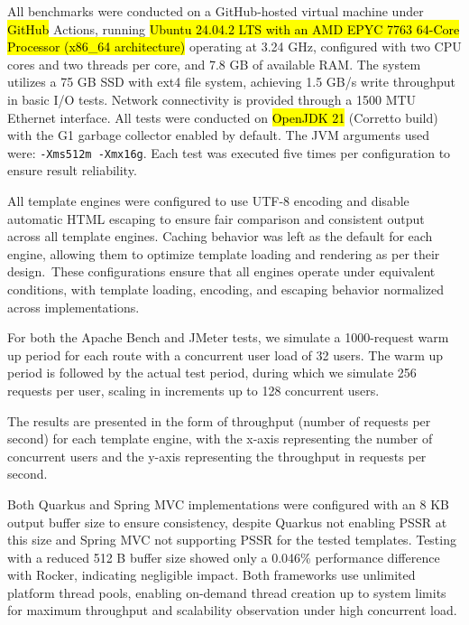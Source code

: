 \documentclass[software,article,accept,pdftex,moreauthors]{Definitions/mdpi}
\begin{document}
All benchmarks were conducted on a GitHub-hosted virtual machine under \hl{GitHub} %
Actions, running \hl{Ubuntu 24.04.2 LTS with an AMD EPYC 7763 64-Core Processor
(x86\_64 architecture)} %
 operating at 3.24 GHz, configured with two CPU cores and two
threads per core, and 7.8 GB of available RAM. The system utilizes a 75 GB SSD
with ext4 file system, achieving 1.5 GB/s write throughput in basic I/O tests.
Network connectivity is provided through a 1500 MTU Ethernet interface. All
tests were conducted on \hl{OpenJDK 21} (Corretto build) with the G1 garbage
collector enabled by default. The JVM arguments used were: \texttt{-Xms512m
     -Xmx16g}. Each test was executed five times per configuration to ensure result
reliability.

All template engines were configured to use UTF-8 encoding and disable
automatic HTML escaping to ensure fair comparison and consistent output across
all template engines. Caching behavior was left as the default for each
engine, allowing them to optimize template loading and rendering as per their
design.~These configurations ensure that all engines operate under equivalent
conditions, with template loading, encoding, and escaping behavior normalized
across implementations.

For both the Apache Bench and JMeter tests, we simulate a 1000-request warm up
period for each route with a concurrent user load of 32 users. The warm up
period is followed by the actual test period, during which we simulate 256
requests per user, scaling in increments up to 128 concurrent users.

The results are presented in the form of throughput (number of requests per
second) for each template engine, with the x-axis representing the number of
concurrent users and the y-axis representing the throughput in requests per
second.

Both Quarkus and Spring MVC implementations were configured with an 8 KB output
buffer size to ensure consistency, despite Quarkus not enabling PSSR at this
size and Spring MVC not supporting PSSR for the tested templates. Testing with
a reduced 512 B buffer size showed only a 0.046\% performance difference with
Rocker, indicating negligible impact. Both frameworks use unlimited platform
thread pools, enabling on-demand thread creation up to system limits for
maximum throughput and scalability observation under high concurrent load.
\end{document}
